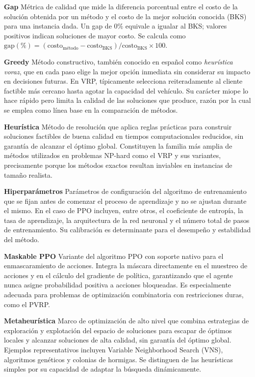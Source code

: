 {{\hangindent=1.5cm \hypertarget{glo:gap}{\textbf{Gap}} 
Métrica de calidad que mide la diferencia porcentual entre el costo de la solución obtenida por un método y el costo de la mejor solución conocida (BKS) para una instancia dada. Un gap de $0\%$ equivale a igualar al BKS; valores positivos indican soluciones de mayor costo. Se calcula como $\text{gap}(\%) = (\text{costo}_{\text{método}} - \text{costo}_{\text{BKS}}) / \text{costo}_{\text{BKS}} \times 100$.

\hangindent=1.5cm \hypertarget{glo:greedy}{\textbf{Greedy}} 
Método constructivo, también conocido en español como \emph{heurística voraz}, que en cada paso elige la mejor opción inmediata sin considerar su impacto en decisiones futuras. En VRP, típicamente selecciona reiteradamente al cliente factible más cercano hasta agotar la capacidad del vehículo. Su carácter miope lo hace rápido pero limita la calidad de las soluciones que produce, razón por la cual se emplea como línea base en la comparación de métodos.

\hangindent=1.5cm \hypertarget{glo:heuristica}{\textbf{Heurística}}
Método de resolución que aplica reglas prácticas para construir soluciones factibles de buena calidad en tiempos computacionales reducidos, sin garantía de alcanzar el óptimo global. Constituyen la familia más amplia de métodos utilizados en problemas NP-hard como el VRP y sus variantes, precisamente porque los métodos exactos resultan inviables en instancias de tamaño realista.

\hangindent=1.5cm \hypertarget{glo:hiperparametros}{\textbf{Hiperparámetros}}
Parámetros de configuración del algoritmo de entrenamiento que se fijan antes de comenzar el proceso de aprendizaje y no se ajustan durante el mismo. En el caso de PPO incluyen, entre otros, el coeficiente de entropía, la tasa de aprendizaje, la arquitectura de la red neuronal y el número total de pasos de entrenamiento. Su calibración es determinante para el desempeño y estabilidad del método.


\hangindent=1.5cm \hypertarget{glo:maskableppo}{\textbf{Maskable PPO}}
Variante del algoritmo PPO con soporte nativo para el enmascaramiento de acciones. Integra la máscara directamente en el muestreo de acciones y en el cálculo del gradiente de política, garantizando que el agente nunca asigne probabilidad positiva a acciones bloqueadas. Es especialmente adecuada para problemas de optimización combinatoria con restricciones duras, como el PVRP.

\hangindent=1.5cm \hypertarget{glo:metaheuristica}{\textbf{Metaheurística}}
Marco de optimización de alto nivel que combina estrategias de exploración y explotación del espacio de soluciones para escapar de óptimos locales y alcanzar soluciones de alta calidad, sin garantía del óptimo global. Ejemplos representativos incluyen Variable Neighborhood Search (VNS), algoritmos genéticos y colonias de hormigas. Se distinguen de las heurísticas simples por su capacidad de adaptar la búsqueda dinámicamente.

}}
